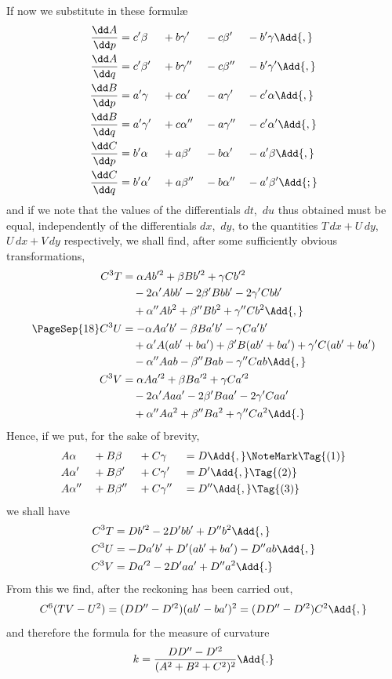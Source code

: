 If now we substitute in these formulæ
\begin{alignat*}{4}
\frac{\dd A}{\dd p} &= c'\beta  &&+ b\gamma'  &&- c\beta'  &&- b'\gamma\Add{,} \\
\frac{\dd A}{\dd q} &= c'\beta' &&+ b\gamma'' &&- c\beta'' &&- b'\gamma'\Add{,} \\
%
\frac{\dd B}{\dd p} &= a'\gamma  &&+ c\alpha'  &&- a\gamma'  &&- c'\alpha\Add{,} \\
\frac{\dd B}{\dd q} &= a'\gamma' &&+ c\alpha'' &&- a\gamma'' &&- c'\alpha'\Add{,} \\
%
\frac{\dd C}{\dd p} &= b'\alpha  &&+ a\beta'  &&- b\alpha'  &&- a'\beta\Add{,} \\
\frac{\dd C}{\dd q} &= b'\alpha' &&+ a\beta'' &&- b\alpha'' &&- a'\beta'\Add{;}
\end{alignat*}
and if we note that the values of the differentials $dt$,~$du$ thus obtained must be equal,
independently of the differentials $dx$,~$dy$, to the quantities $T\, dx + U\, dy$, $U\, dx + V\, dy$
respectively, we shall find, after some sufficiently obvious transformations,
\begin{align*}
C^{3}T &= \alpha Ab'^{2} + \beta Bb'^{2} + \gamma Cb'^{2} \\
&\quad- 2\alpha' Abb' - 2\beta' Bbb' - 2\gamma' Cbb' \\
&\quad+ \alpha'' Ab^{2} + \beta'' Bb^{2} + \gamma'' Cb^{2}\Add{,} \\
\PageSep{18}
C^{3}U &= -\alpha Aa'b' - \beta Ba'b' - \gamma Ca'b' \\
&\quad+ \alpha' A(ab' + ba') + \beta' B(ab' + ba') + \gamma' C(ab' + ba') \\
&\quad- \alpha'' Aab - \beta'' Bab - \gamma'' Cab\Add{,} \\
%
C^{3}V &= \alpha Aa'^{2} + \beta Ba'^{2} + \gamma Ca'^{2} \\
&\quad- 2\alpha' Aaa' - 2\beta' Baa' - 2\gamma' Caa' \\
&\quad+ \alpha'' Aa^{2} + \beta'' Ba^{2} + \gamma'' Ca^{2}\Add{.}
\end{align*}
Hence, if we put, for the sake of brevity,
\begin{alignat*}{4}
&A\alpha   &&+ B\beta   &&+ C\gamma   &&= D\Add{,}\NoteMark
\Tag{(1)} \\
&A\alpha'  &&+ B\beta'  &&+ C\gamma'  &&= D'\Add{,}
\Tag{(2)} \\
&A\alpha'' &&+ B\beta'' &&+ C\gamma'' &&= D''\Add{,}
\Tag{(3)}
\end{alignat*}
we shall have
\begin{align*}
C^{3}T &=  Db'^{2} - 2D'bb' + D'' b^{2}\Add{,} \\
C^{3}U &= -Da'b' + D'(ab' + ba') - D''ab\Add{,} \\
C^{3}V &=  Da'^{2} - 2D'aa' + D''a^{2}\Add{.}
\end{align*}
From this we find, after the reckoning has been carried out,
\[
C^{6}(TV - U^{2}) = (DD'' - D'^{2}) (ab' - ba')^{2} = (DD'' - D'^{2}) C^{2}\Add{,}
\]
and therefore the formula for the measure of curvature
\[
k = \frac{DD'' - D'^{2}}{(A^{2} + B^{2} + C^{2})^{2}}\Add{.}
\]


